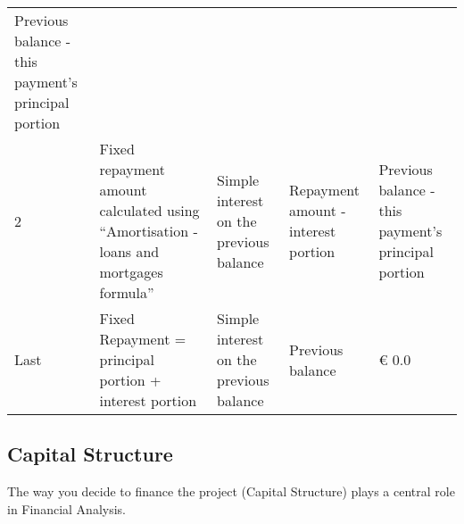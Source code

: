 \documentclass[]{book}
\newcommand{\euro}{€}
\theoremstyle{definition}
\theoremstyle{definition}
\theoremstyle{definition}
\theoremstyle{remark}
\begin{document}
\begin{longtable}[]{@{}lllll@{}}
\begin{minipage}[t]{0.17\columnwidth}
Previous balance - this payment's principal portion\strut
\end{minipage}\tabularnewline
\begin{minipage}[t]{0.17\columnwidth}\raggedright\strut
2\strut
\end{minipage} & \begin{minipage}[t]{0.17\columnwidth}\raggedright\strut
Fixed repayment amount calculated using ``Amortisation - loans and
mortgages formula''\strut
\end{minipage} & \begin{minipage}[t]{0.17\columnwidth}\raggedright\strut
Simple interest on the previous balance\strut
\end{minipage} & \begin{minipage}[t]{0.17\columnwidth}\raggedright\strut
Repayment amount - interest portion\strut
\end{minipage} & \begin{minipage}[t]{0.17\columnwidth}\raggedright\strut
Previous balance - this payment's principal portion\strut
\end{minipage}\tabularnewline
\begin{minipage}[t]{0.17\columnwidth}\raggedright\strut
Last\strut
\end{minipage} & \begin{minipage}[t]{0.17\columnwidth}\raggedright\strut
Fixed Repayment = principal portion + interest portion\strut
\end{minipage} & \begin{minipage}[t]{0.17\columnwidth}\raggedright\strut
Simple interest on the previous balance\strut
\end{minipage} & \begin{minipage}[t]{0.17\columnwidth}\raggedright\strut
Previous balance\strut
\end{minipage} & \begin{minipage}[t]{0.17\columnwidth}\raggedright\strut
\euro{} 0.0\strut
\end{minipage}\tabularnewline
\bottomrule
\end{longtable}

\subsection{Capital Structure}\label{capital-structure}

The way you decide to finance the project (Capital Structure) plays a
central role in Financial Analysis.
\end{document}
